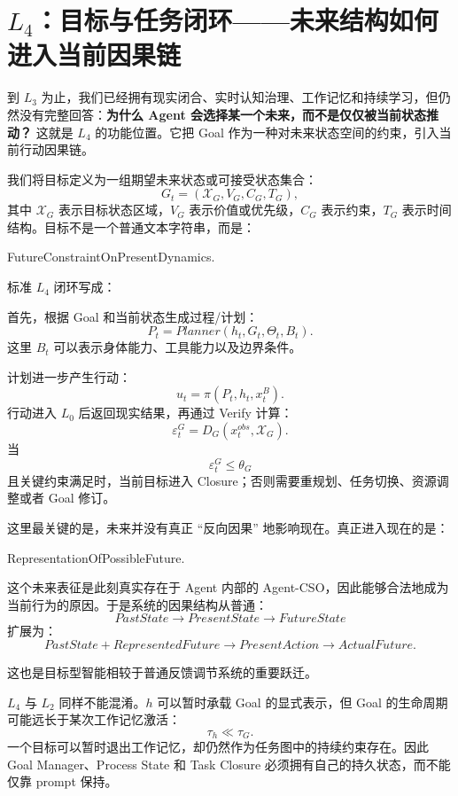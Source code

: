 \section{$L_4$：目标与任务闭环——未来结构如何进入当前因果链}

到 $L_3$ 为止，我们已经拥有现实闭合、实时认知治理、工作记忆和持续学习，但仍然没有完整回答：\textbf{为什么 Agent 会选择某一个未来，而不是仅仅被当前状态推动？} 这就是 $L_4$ 的功能位置。它把 Goal 作为一种对未来状态空间的约束，引入当前行动因果链。

我们将目标定义为一组期望未来状态或可接受状态集合：
\[
G_t
=
\left(
\mathcal X_G,
V_G,
C_G,
T_G
\right),
\]
其中 $\mathcal X_G$ 表示目标状态区域，$V_G$ 表示价值或优先级，$C_G$ 表示约束，$T_G$ 表示时间结构。目标不是一个普通文本字符串，而是：
\begin{statementbox}
FutureConstraintOnPresentDynamics.
\end{statementbox}

标准 $L_4$ 闭环写成：
\begin{statementbox}
\centering
{}
\end{statementbox}

首先，根据 Goal 和当前状态生成过程/计划：
\[
P_t
=
Planner
\left(
h_t,
G_t,
\Theta_t,
B_t
\right).
\]
这里 $B_t$ 可以表示身体能力、工具能力以及边界条件。

计划进一步产生行动：
\[
u_t
=
\pi
\left(
P_t,
h_t,
x^B_t
\right).
\]
行动进入 $L_0$ 后返回现实结果，再通过 Verify 计算：
\[
\varepsilon^G_t
=
D_G
\left(
x^{obs}_t,
\mathcal X_G
\right).
\]
当
\[
\varepsilon^G_t
\leq
\theta_G
\]
且关键约束满足时，当前目标进入 Closure；否则需要重规划、任务切换、资源调整或者 Goal 修订。

这里最关键的是，未来并没有真正 ``反向因果'' 地影响现在。真正进入现在的是：
\begin{statementbox}
RepresentationOfPossibleFuture.
\end{statementbox}
这个未来表征是此刻真实存在于 Agent 内部的 Agent-CSO，因此能够合法地成为当前行为的原因。于是系统的因果结构从普通：
\[
PastState\rightarrow PresentState\rightarrow FutureState
\]
扩展为：
\[
PastState
+
RepresentedFuture
\rightarrow
PresentAction
\rightarrow
ActualFuture.
\]

这也是目标型智能相较于普通反馈调节系统的重要跃迁。

$L_4$ 与 $L_2$ 同样不能混淆。$h$ 可以暂时承载 Goal 的显式表示，但 Goal 的生命周期可能远长于某次工作记忆激活：
\[
\tau_h
\ll
\tau_G.
\]
一个目标可以暂时退出工作记忆，却仍然作为任务图中的持续约束存在。因此 Goal Manager、Process State 和 Task Closure 必须拥有自己的持久状态，而不能仅靠 prompt 保持。

